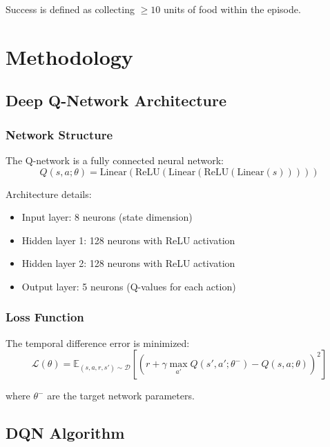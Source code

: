 \documentclass[12pt,a4paper]{article}
\begin{document}
Success is defined as collecting $\geq 10$ units of food within the episode.

\section{Methodology}

\subsection{Deep Q-Network Architecture}

\subsubsection{Network Structure}
The Q-network is a fully connected neural network:
\begin{equation}
Q(s, a; \theta) = \text{Linear}(\text{ReLU}(\text{Linear}(\text{ReLU}(\text{Linear}(s)))))
\end{equation}

Architecture details:
\begin{itemize}
    \item Input layer: 8 neurons (state dimension)
    \item Hidden layer 1: 128 neurons with ReLU activation
    \item Hidden layer 2: 128 neurons with ReLU activation
    \item Output layer: 5 neurons (Q-values for each action)
\end{itemize}

\subsubsection{Loss Function}
The temporal difference error is minimized:
\begin{equation}
\mathcal{L}(\theta) = \mathbb{E}_{(s,a,r,s') \sim \mathcal{D}} \left[ \left( r + \gamma \max_{a'} Q(s', a'; \theta^-) - Q(s, a; \theta) \right)^2 \right]
\end{equation}

where $\theta^-$ are the target network parameters.

\subsection{DQN Algorithm}
\end{document}
